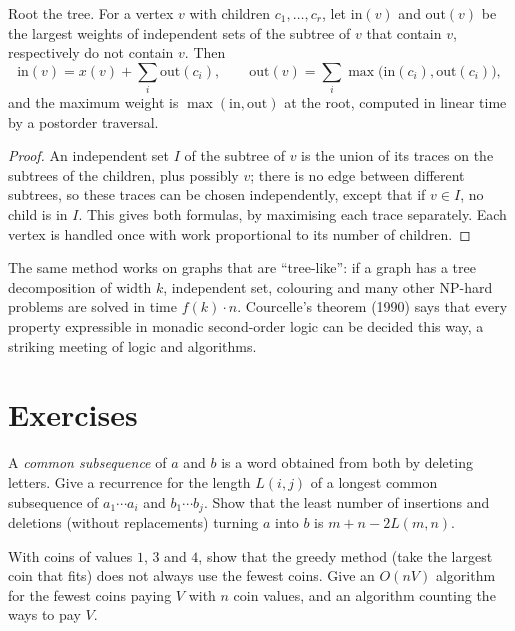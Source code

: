 \begin{proposition}\label{prop:treemis}
Root the tree. For a vertex $v$ with children $c_1,\dots,c_r$, let $\mathrm{in}(v)$ and $\mathrm{out}(v)$ be the largest weights of independent sets of the subtree of $v$ that contain $v$, respectively do not contain $v$. Then
\[
\mathrm{in}(v)=x(v)+\sum_i\mathrm{out}(c_i),\qquad \mathrm{out}(v)=\sum_i\max\big(\mathrm{in}(c_i),\mathrm{out}(c_i)\big),
\]
and the maximum weight is $\max(\mathrm{in},\mathrm{out})$ at the root, computed in linear time by a postorder traversal.
\end{proposition}
\begin{proof}
An independent set $I$ of the subtree of $v$ is the union of its traces on the subtrees of the children, plus possibly $v$; there is no edge between different subtrees, so these traces can be chosen independently, except that
if $v\in I$, no child is in $I$. This gives both formulas, by maximising each trace separately. Each vertex is handled once with work proportional to its number of children.
\end{proof}

\begin{remark}
The same method works on graphs that are ``tree-like'': if a graph has a tree decomposition of width $k$, independent set, colouring and many other NP-hard problems are solved in time $f(k)\cdot n$. Courcelle's theorem (1990)
says that every property expressible in monadic second-order logic can be decided this way, a striking meeting of logic and algorithms.
\end{remark}

\section{Exercises}

\begin{exercise}[$\star$]\label{ex:lcs}
A \emph{common subsequence} of $a$ and $b$ is a word obtained from both by deleting letters. Give a recurrence for the length $L(i,j)$ of a longest common subsequence of $a_1\cdots a_i$ and $b_1\cdots b_j$. Show that the least number of
insertions and deletions (without replacements) turning $a$ into $b$ is $m+n-2L(m,n)$.
\end{exercise}

\begin{exercise}[$\star$]\label{ex:coins}
With coins of values $1$, $3$ and $4$, show that the greedy method (take the largest coin that fits) does not always use the fewest coins. Give an $O(nV)$ algorithm for the fewest coins paying $V$ with $n$ coin values, and an algorithm
counting the ways to pay $V$.
\end{exercise}

